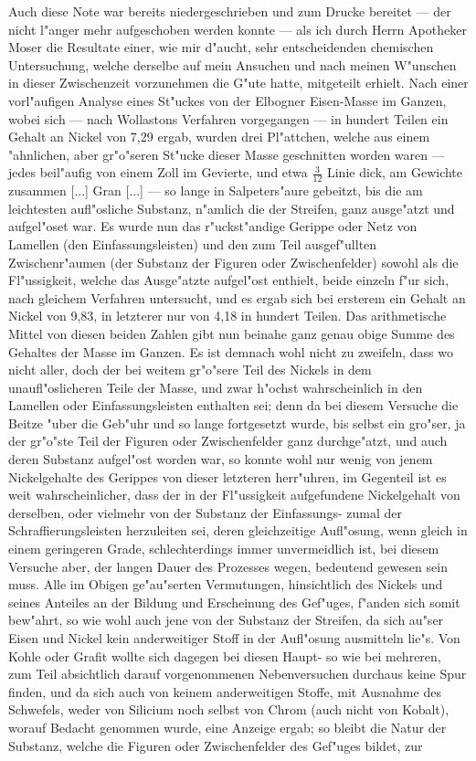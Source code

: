 \documentclass[a4paper, 11pt, oneside, german]{article}
\begin{document}
{\hspace*{6mm}Auch diese Note war bereits niedergeschrieben und zum Drucke bereitet --- der nicht l"anger mehr aufgeschoben werden konnte --- als ich durch Herrn Apotheker Moser die Resultate einer, wie mir d"aucht, sehr entscheidenden chemischen Untersuchung, welche derselbe auf mein Ansuchen und nach meinen W"unschen in dieser Zwischenzeit vorzunehmen die G"ute hatte, mitgeteilt erhielt. Nach einer vorl"aufigen Analyse eines St"uckes von der Elbogner Eisen-Masse im Ganzen, wobei sich --- nach Wollastons Verfahren vorgegangen --- in hundert Teilen ein Gehalt an Nickel von 7,29 ergab, wurden drei Pl"attchen, welche aus einem "ahnlichen, aber gr"o"seren St"ucke dieser Masse geschnitten worden waren --- jedes beil"aufig von einem Zoll im Gevierte, und etwa $\frac{3}{12}$ Linie dick, am Gewichte zusammen [...] Gran [...] --- so lange in Salpeters"aure gebeitzt, bis die am leichtesten aufl"osliche Substanz, n"amlich die der Streifen, ganz ausge"atzt und aufgel"oset war. Es wurde nun das r"uckst"andige Gerippe oder Netz von Lamellen (den Einfassungsleisten) und den zum Teil ausgef"ullten Zwischenr"aumen (der Substanz der Figuren oder Zwischenfelder) sowohl als die Fl"ussigkeit, welche das Ausge"atzte aufgel"ost enthielt, beide einzeln f"ur sich, nach gleichem Verfahren untersucht, und es ergab sich bei ersterem ein Gehalt an Nickel von 9,83, in letzterer nur von 4,18 in hundert Teilen. Das arithmetische Mittel von diesen beiden Zahlen gibt nun beinahe ganz genau obige Summe des Gehaltes der Masse im Ganzen. Es ist demnach wohl nicht zu zweifeln, dass wo nicht aller, doch der bei weitem gr"o"sere Teil des Nickels in dem unaufl"oslicheren Teile der Masse, und zwar h"ochst wahrscheinlich in den Lamellen oder Einfassungsleisten enthalten sei; denn da bei diesem Versuche die Beitze "uber die Geb"uhr und so lange fortgesetzt wurde, bis selbst ein gro"ser, ja der gr"o"ste Teil der Figuren oder Zwischenfelder ganz durchge"atzt, und auch deren Substanz aufgel"ost worden war, so konnte wohl nur wenig von jenem Nickelgehalte des Gerippes von dieser letzteren herr"uhren, im Gegenteil ist es weit wahrscheinlicher, dass der in der Fl"ussigkeit aufgefundene Nickelgehalt von derselben, oder vielmehr von der Substanz der Einfassungs- zumal der Schraffierungsleisten herzuleiten sei, deren gleichzeitige Aufl"osung, wenn gleich in einem geringeren Grade, schlechterdings immer unvermeidlich ist, bei diesem Versuche aber, der langen Dauer des Prozesses wegen, bedeutend gewesen sein muss. Alle im Obigen ge"au"serten Vermutungen, hinsichtlich des Nickels und seines Anteiles an der Bildung und Erscheinung des Gef"uges, f"anden sich somit bew"ahrt, so wie wohl auch jene von der Substanz der Streifen, da sich au"ser Eisen und Nickel kein anderweitiger Stoff in der Aufl"osung ausmitteln lie"s. Von Kohle oder Grafit wollte sich dagegen bei diesen Haupt- so wie bei mehreren, zum Teil absichtlich darauf vorgenommenen Nebenversuchen durchaus keine Spur finden, und da sich auch von keinem anderweitigen Stoffe, mit Ausnahme des Schwefels, weder von Silicium noch selbst von Chrom (auch nicht von Kobalt), worauf Bedacht genommen wurde, eine Anzeige ergab; so bleibt die Natur der Substanz, welche die Figuren oder Zwischenfelder des Gef"uges bildet, zur }
\end{document}
